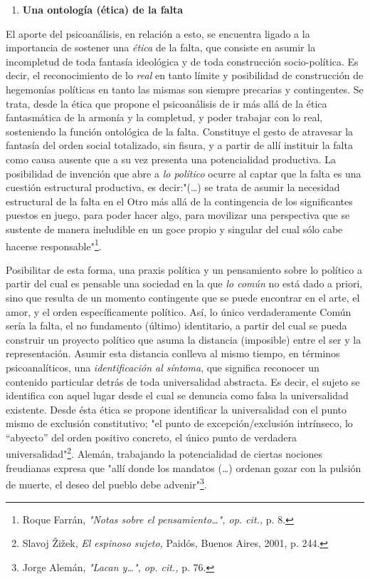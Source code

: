 \documentclass{book}
\begin{document}
\begin{enumerate}
\def\labelenumi{\arabic{enumi}.}
\setcounter{enumi}{6}
\item
  \textbf{Una ontología (ética) de la falta}
\end{enumerate}

El aporte del psicoanálisis, en relación a esto, se encuentra ligado a
la importancia de sostener una \emph{ética} de la falta, que consiste en
asumir la incompletud de toda fantasía ideológica y de toda construcción
socio-política. Es decir, el reconocimiento de lo \emph{real} en tanto
límite y posibilidad de construcción de hegemonías políticas en tanto
las mismas son siempre precarias y contingentes. Se trata, desde la
ética que propone el psicoanálisis de ir más allá de la ética
fantasmática de la armonía y la completud, y poder trabajar con lo real,
sosteniendo la función ontológica de la falta. Constituye el gesto de
atravesar la fantasía del orden social totalizado, sin fisura, y a
partir de allí instituir la falta como causa ausente que a su vez
presenta una potencialidad productiva. La posibilidad de invención que
abre a \emph{lo político} ocurre al captar que la falta es una cuestión
estructural productiva, es decir:"(\dots) se trata de asumir la
necesidad estructural de la falta en el Otro más allá de la contingencia
de los significantes puestos en juego, para poder hacer algo, para
movilizar una perspectiva que se sustente de manera ineludible en un
goce propio y singular del cual sólo cabe hacerse
responsable"\footnote{Roque Farrán, \emph{"Notas sobre el
  pensamiento\ldots", op. cit.,} p. 8.}.

Posibilitar de esta forma, una praxis política y un pensamiento sobre lo
político a partir del cual es pensable una sociedad en la que \emph{lo
común} no está dado a priori, sino que resulta de un momento contingente
que se puede encontrar en el arte, el amor, y el orden específicamente
político. Así, lo único verdaderamente Común sería la falta, el no
fundamento (último) identitario, a partir del cual se pueda construir un
proyecto político que asuma la distancia (imposible) entre el ser y la
representación. Asumir esta distancia conlleva al mismo tiempo, en
términos psicoanalíticos, una \emph{identificación al síntoma}, que
significa reconocer un contenido particular detrás de toda universalidad
abstracta. Es decir, el sujeto se identifica con aquel lugar desde el
cual se denuncia como falsa la universalidad existente. Desde ésta ética
se propone identificar la universalidad con el punto mismo de exclusión
constitutivo; "el punto de excepción/exclusión intrínseco, lo
``abyecto'' del orden positivo concreto, el único punto de verdadera
universalidad"\footnote{Slavoj Žižek, \emph{El espinoso sujeto,} Paidós,
  Buenos Aires, 2001, p. 244.}. Alemán, trabajando la potencialidad de
ciertas nociones freudianas expresa que "allí donde los mandatos
(\dots) ordenan gozar con la pulsión de muerte, el deseo del pueblo
debe advenir"\footnote{Jorge Alemán, \emph{"Lacan y\ldots", op. cit.,}
  p. 76.}.
\end{document}
